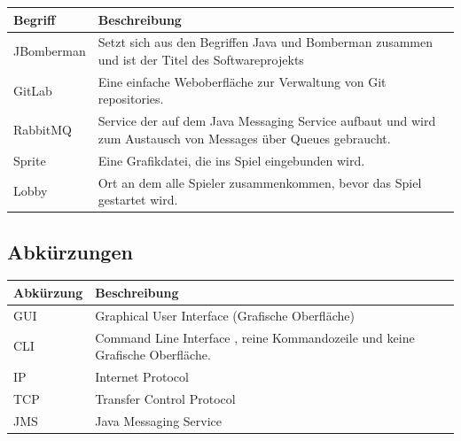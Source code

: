 \documentclass[11pt]{scrartcl}
\begin{document}
\begin{tabularx}{\linewidth}{l | X}
    \textbf{Begriff} & \textbf{Beschreibung}\\
    \hline
    JBomberman & Setzt sich aus den Begriffen Java und Bomberman zusammen und ist der Titel des Softwareprojekts\\
    \hline
    GitLab & Eine einfache Weboberfläche zur Verwaltung von Git repositories.\\
    \hline
    RabbitMQ & Service der auf dem Java Messaging Service aufbaut und wird zum Austausch von Messages über Queues gebraucht.\\
    \hline
    Sprite & Eine Grafikdatei, die ins Spiel eingebunden wird.\\
    \hline
    Lobby & Ort an dem alle Spieler zusammenkommen, bevor das Spiel gestartet wird.\\
    
\end{tabularx}

\subsection{Abkürzungen}
\begin{tabularx}{\linewidth}{l | X}
    \textbf{Abkürzung} & \textbf{Beschreibung}\\
    \hline
    GUI & Graphical User Interface (Grafische Oberfläche)\\
    \hline
    CLI & Command Line Interface  , reine Kommandozeile und keine Grafische Oberfläche.\\
    \hline 
    IP & Internet Protocol\\
    \hline
    TCP & Transfer Control Protocol\\
    \hline
    JMS & Java Messaging Service\\
\end{tabularx}
\end{document}
